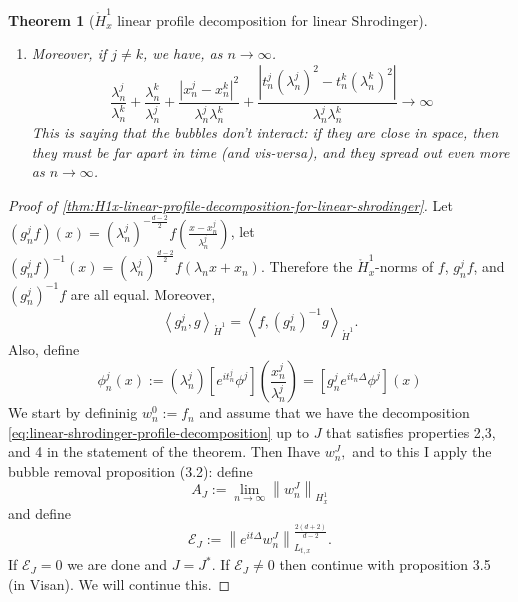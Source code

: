 \documentclass{article}
\newtheorem{theorem}{Theorem}
\newcommand\norm[1]{\left\lVert#1\right\rVert}
\begin{document}
\begin{theorem}[$\mathring{H}_x^1$ linear profile decomposition for linear Shrodinger]
\begin{enumerate}
    \begin{equation*}
      e^{-it_{n}^{J}}\left[ \left( \lambda_{n}^{J}
        \right)^{\frac{d-2}{2}}w_{n}^{J}(\lambda_{n}^{J}+x_{n}^{J})  \right]
      \rightharpoonup  0 \text{ weakly in }\mathring{H}^{1}
    \end{equation*}
    \item Moreover, if $j \neq k$,  we have, as $n \to \infty$.
    \begin{equation*} \frac{\lambda_{n}^{j}}{\lambda_{n}^{k}}+\frac{\lambda_{n}^{k}}{\lambda_{n}^{j}}+ \frac{\left| x_{n}^{j}-x_{n}^{k} \right|^{2}}{\lambda_{n}^{j}\lambda_{n}^{k}}+\frac{\left| t_{n}^{j}(\lambda_{n}^{j})^{2}-t_{n}^{k}(\lambda_{n}^{k})^{2} \right|}{\lambda_{n}^{j}\lambda_{n}^{k}} \to \infty
    \end{equation*}
    This is saying that the bubbles don't interact: if they are close in space,
    then they must be far apart in time (and vis-versa), and they spread out
    even more as $n \to\infty$. 
  \end{enumerate}
\end{theorem}
\begin{proof}[Proof of \cref{thm:H1x-linear-profile-decomposition-for-linear-shrodinger}]
  Let $(g_{n}^{j}f)(x)= \left( \lambda_{n}^{j} \right)^{-\frac{d-2}{2}}f \left(
    \frac{x-x_{n}^{j}}{\lambda_{n}^{j}} \right) $, let $(g^{j}_{n}f)^{-1}(x)=
  \left( \lambda_{n}^{j} \right)^{\frac{d-2}{2}}f(\lambda_{n}x+x_{n}) $.
  Therefore the $\mathring{H}_{x}^{1}$-norms of $f$, $g_{n}^{j}f $, and
  $(g_{n}^{j})^{-1}f$ are all equal. Moreover,
  \begin{equation*}
    \left\langle g_{n}^{j},g \right\rangle_{\mathring{H}^{1}} = \left\langle f, (g_{n}^{j})^{-1}g \right\rangle_{\mathring{H}^{1}}.
  \end{equation*}
  Also, define
  \begin{equation*}
    \phi^{j}_{n}(x):= \left( \lambda_{n}^{j} \right) \left[ e^{it_{n}^{j}}\phi^{j} \right] \left( \frac{x_{n}^{j}}{\lambda_{n}^{j}} \right)  = \left[ g_{n}^{j}e^{it_{n}\Delta}\phi^{j} \right] (x)
  \end{equation*}
  We start by defininig $w^{0}_{n}:=f_{n}$ and assume that we have the
  decomposition \cref{eq:linear-shrodinger-profile-decomposition} up to $J$ that
  satisfies properties 2,3, and 4 in the statement of the theorem. Then Ihave
  $w_{n}^{J},$ and to this I apply the bubble removal proposition (3.2): define
  \begin{equation*}
    A_{J} := \lim_{n\to\infty} \norm{w_{n}^{J}}_{H_{x}^{1}}
  \end{equation*}
  and define
  \begin{equation*}
    \mathcal{E}_{J}:= \norm{e^{it\Delta}w_{n}^{J}}_{L_{t,x}}^{\frac{2(d+2)}{d-2}}.
  \end{equation*}
  If $\mathcal{E}_{J}=0$ we are done and $J=J^{*}$. If $\mathcal{E}_{J} \neq 0$
  then continue with proposition 3.5 (in Visan). We will continue this. 
\end{proof}
\end{document}

